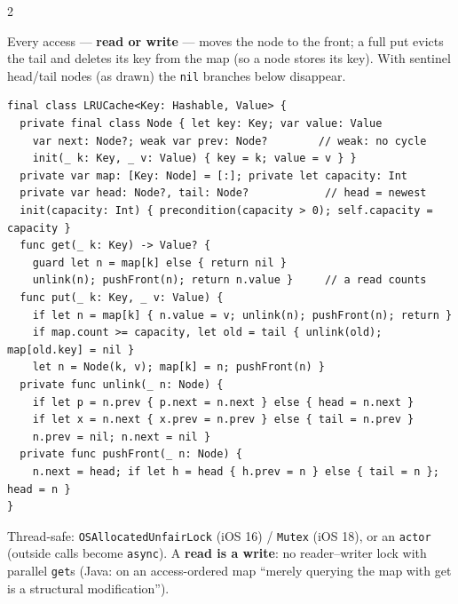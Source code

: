 \documentclass[8pt]{extarticle}
\newcommand\ct[1]{\texttt{#1}}
\newcommand\dq[3]{\par\vspace{2pt}\noindent\colorbox{sheetBlue!12}{\makebox[\dimexpr\linewidth-2\fboxsep][l]{\bfseries\footnotesize\color{sheetBlue}#1\mdseries\color{black}~— #2\hfill\ttfamily #3}}\par\vspace{1pt}}
\begin{document}
\begin{multicols}{2}
\raggedright
\footnotesize{}

\dq{LRU cache}{\ct{[K: Node]} + DLL}{get/put O(1)}
Every access — \textbf{read or write} — moves the node to the front; a full
put evicts the tail and deletes its key from the map (so a node stores its key).
With sentinel head/tail nodes (as drawn) the \ct{nil} branches below disappear.
\begin{lstlisting}[language=SwiftSheet]
final class LRUCache<Key: Hashable, Value> {
  private final class Node { let key: Key; var value: Value
    var next: Node?; weak var prev: Node?        // weak: no cycle
    init(_ k: Key, _ v: Value) { key = k; value = v } }
  private var map: [Key: Node] = [:]; private let capacity: Int
  private var head: Node?, tail: Node?            // head = newest
  init(capacity: Int) { precondition(capacity > 0); self.capacity = capacity }
  func get(_ k: Key) -> Value? {
    guard let n = map[k] else { return nil }
    unlink(n); pushFront(n); return n.value }     // a read counts
  func put(_ k: Key, _ v: Value) {
    if let n = map[k] { n.value = v; unlink(n); pushFront(n); return }
    if map.count >= capacity, let old = tail { unlink(old); map[old.key] = nil }
    let n = Node(k, v); map[k] = n; pushFront(n) }
  private func unlink(_ n: Node) {
    if let p = n.prev { p.next = n.next } else { head = n.next }
    if let x = n.next { x.prev = n.prev } else { tail = n.prev }
    n.prev = nil; n.next = nil }
  private func pushFront(_ n: Node) {
    n.next = head; if let h = head { h.prev = n } else { tail = n }; head = n }
}
\end{lstlisting}
Thread-safe: \ct{OSAllocatedUnfairLock} (iOS 16) / \ct{Mutex} (iOS 18), or an
\ct{actor} (outside calls become \ct{async}). A \textbf{read is a write}: no
reader–writer lock with parallel \ct{get}s (Java: on an access-ordered map ``merely
querying the map with get is a structural modification'').


\end{multicols}
\end{document}
